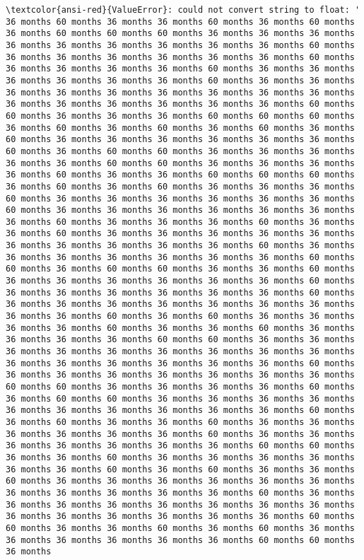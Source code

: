 \documentclass[11pt]{article}
\begin{document}
\begin{Verbatim}[commandchars=\\\{\}, frame=single, framerule=2mm, rulecolor=\color{outerrorbackground}]
\textcolor{ansi-red}{ValueError}: could not convert string to float: ' 36 months 60 months 36 months 36 months 60 months 36 months 60 months 36 months 60 months 60 months 60 months 36 months 36 months 36 months 36 months 36 months 36 months 36 months 36 months 36 months 60 months 36 months 36 months 36 months 36 months 36 months 36 months 60 months 36 months 36 months 36 months 36 months 60 months 36 months 36 months 36 months 36 months 36 months 36 months 60 months 36 months 36 months 36 months 36 months 36 months 36 months 36 months 36 months 36 months 36 months 36 months 36 months 36 months 36 months 36 months 60 months 60 months 36 months 36 months 36 months 60 months 60 months 60 months 36 months 60 months 36 months 60 months 36 months 60 months 36 months 60 months 36 months 36 months 36 months 36 months 36 months 36 months 60 months 36 months 60 months 60 months 36 months 36 months 36 months 36 months 36 months 60 months 60 months 36 months 36 months 36 months 36 months 60 months 36 months 36 months 60 months 60 months 60 months 36 months 60 months 36 months 60 months 36 months 36 months 36 months 60 months 36 months 36 months 36 months 36 months 36 months 36 months 60 months 36 months 36 months 36 months 36 months 36 months 36 months 36 months 60 months 36 months 36 months 36 months 60 months 36 months 36 months 60 months 36 months 36 months 36 months 36 months 36 months 36 months 36 months 36 months 36 months 36 months 60 months 36 months 36 months 36 months 36 months 36 months 36 months 36 months 60 months 60 months 36 months 60 months 60 months 36 months 36 months 60 months 36 months 36 months 36 months 36 months 36 months 36 months 60 months 36 months 36 months 36 months 36 months 36 months 36 months 60 months 36 months 36 months 36 months 36 months 36 months 36 months 36 months 36 months 36 months 60 months 36 months 60 months 36 months 36 months 36 months 36 months 60 months 36 months 36 months 60 months 36 months 36 months 36 months 36 months 60 months 60 months 36 months 36 months 36 months 36 months 36 months 36 months 36 months 36 months 36 months 36 months 36 months 36 months 36 months 36 months 36 months 60 months 36 months 36 months 36 months 36 months 36 months 36 months 36 months 60 months 60 months 36 months 36 months 36 months 36 months 60 months 36 months 60 months 60 months 36 months 36 months 36 months 36 months 36 months 36 months 36 months 36 months 36 months 36 months 60 months 36 months 60 months 36 months 36 months 60 months 36 months 36 months 36 months 36 months 36 months 36 months 60 months 36 months 36 months 36 months 36 months 36 months 36 months 36 months 60 months 60 months 36 months 36 months 60 months 36 months 36 months 36 months 36 months 36 months 36 months 60 months 36 months 60 months 36 months 36 months 60 months 36 months 36 months 36 months 36 months 36 months 36 months 36 months 36 months 36 months 36 months 36 months 60 months 36 months 36 months 36 months 36 months 36 months 36 months 36 months 36 months 36 months 36 months 36 months 36 months 36 months 36 months 60 months 60 months 36 months 36 months 60 months 36 months 60 months 36 months 36 months 36 months 36 months 36 months 36 months 60 months 60 months 36 months 
\end{Verbatim}
\end{document}
